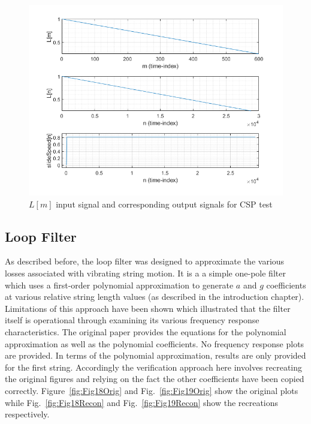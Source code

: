 \documentclass[../main.tex]{subfiles}
\begin{document}
\clearpage

\begin{figure}[h]
    \centering
    \includegraphics[scale=.65]{./images/plots/CSPTest.png}
    \caption{$L[m]$ input signal and corresponding output signals for CSP test}
    \label{fig:CSPTest}
\end{figure}

\subsection{Loop Filter}
As described before, the loop filter was designed to approximate the various losses associated with vibrating string motion. It is a a simple one-pole filter which uses a first-order polynomial approximation to generate $a$ and $g$ coefficients at various relative string length values (as described in the introduction chapter). Limitations of this approach have been shown which illustrated that the filter itself is operational through examining its various frequency response characteristics. The original paper provides the equations for the polynomial approximation as well as the polynomial coefficients. No frequency response plots are provided. In terms of the polynomial approximation, results are only provided for the first string. Accordingly the verification approach here involves recreating the original figures and relying on the fact the other coefficients have been copied correctly. Figure~\ref{fig:Fig18Orig} and Fig.~\ref{fig:Fig19Orig} show the original plots while Fig.~\ref{fig:Fig18Recon} and Fig.~\ref{fig:Fig19Recon} show the recreations respectively.
\end{document}
